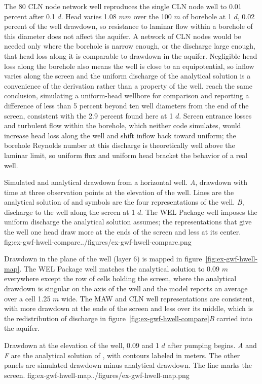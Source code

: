 The 80 CLN node network well reproduces the single CLN node well to 0.01 percent after 0.1 $d$. Head varies 1.08 $mm$ over the 100 $m$ of borehole at 1 $d$, 0.02 percent of the well drawdown, so resistance to laminar flow within a borehole of this diameter does not affect the aquifer. A network of CLN nodes would be needed only where the borehole is narrow enough, or the discharge large enough, that head loss along it is comparable to drawdown in the aquifer. Negligible head loss along the borehole also means the well is close to an equipotential, so inflow varies along the screen and the uniform discharge of the analytical solution is a convenience of the derivation rather than a property of the well. \cite{zhan2001} reach the same conclusion, simulating a uniform-head wellbore for comparison and reporting a difference of less than 5 percent beyond ten well diameters from the end of the screen, consistent with the 2.9 percent found here at 1 $d$. Screen entrance losses and turbulent flow within the borehole, which neither code simulates, would increase head loss along the well and shift inflow back toward uniform; the borehole Reynolds number at this discharge is theoretically well above the laminar limit, so uniform flux and uniform head bracket the behavior of a real well.

\begin{StandardFigure}{
    Simulated and analytical drawdown from a horizontal well. \textit{A}, drawdown
    with time at three observation points at the elevation of the well. Lines are
    the analytical solution of \cite{zhan2001} and symbols are the four
    representations of the well. \textit{B}, discharge to the well along the screen
    at 1 $d$. The WEL Package well imposes the uniform discharge the
    analytical solution assumes; the representations that give the well one head
    draw more at the ends of the screen and less at its center.
    }{fig:ex-gwf-hwell-compare}{../figures/ex-gwf-hwell-compare.png}
\end{StandardFigure}

Drawdown in the plane of the well (layer 6) is mapped in figure~\ref{fig:ex-gwf-hwell-map}. The WEL Package well matches the analytical solution to 0.09 $m$ everywhere except the row of cells holding the screen, where the analytical drawdown is singular on the axis of the well and the model reports an average over a cell 1.25 $m$ wide. The MAW and CLN well representations are consistent, with more drawdown at the ends of the screen and less over its middle, which is the redistribution of discharge in figure~\ref{fig:ex-gwf-hwell-compare}\textit{B} carried into the aquifer.

\begin{StandardFigure}{
    Drawdown at the elevation of the well, 0.09 and 1 $d$ after pumping begins.
    \textit{A} and \textit{F} are the analytical solution of \cite{zhan2001}, with
    contours labeled in meters. The other panels are simulated drawdown minus
    analytical drawdown. The line marks the screen.
    }{fig:ex-gwf-hwell-map}{../figures/ex-gwf-hwell-map.png}
\end{StandardFigure}

